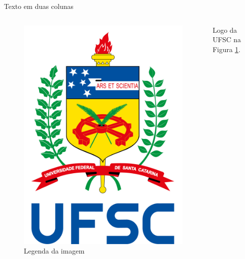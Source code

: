 \documentclass[t]{beamer}
\begin{document}
\begin{frame}{Texto em duas colunas}
\begin{columns}[c]
\begin{column}{.5\textwidth}
\begin{figure}[!ht]
\centering
\includegraphics[scale=.2]{logo.png}
\caption{Legenda da imagem}
\label{fig:rotulo}
\end{figure}
\end{column}
\begin{column}{.5\textwidth}
Logo da UFSC na Figura \ref{fig:rotulo}.
\end{column}
\end{columns}
\end{frame}
\end{document}
